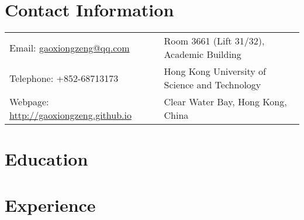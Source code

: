\documentclass[10pt,a4paper,roman]{moderncv} %
\begin{document}
\makecvtitle %

\section{Contact Information}
\vspace{2mm}
\begin{tabular}{p{9cm} l}
Email: \href{mailto:gaoxiongzeng@qq.com}{gaoxiongzeng@qq.com} &  Room 3661 (Lift 31/32), Academic Building\\
Telephone: +852-68713173 & Hong Kong University of Science and Technology\\
Webpage: \textcolor{blue}{\url{http://gaoxiongzeng.github.io}} & Clear Water Bay, Hong Kong, China\\
\end{tabular}


\section{Education}
\vspace{2mm}
\vspace{3mm}



\section{Experience}

\end{document}
